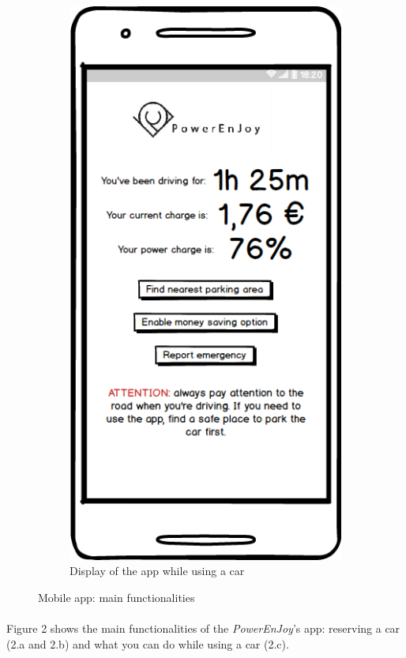 \begin{figure}[h]
\begin{subfigure}{0.3\textwidth}
			\includegraphics[scale=0.25]{img/mockups/User_driving.png}
			\caption{Display of the app while using a car}
			\label{fig:subim2}
		\end{subfigure}
 		
		
		\caption{Mobile app: main functionalities}
		\label{fig:image1}
	\end{figure}
	
	\paragraph{} Figure 2 shows the main functionalities of the \textit{PowerEnJoy}'s app: reserving a car (2.a and 2.b) and what you can do while using a car (2.c). 